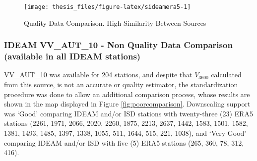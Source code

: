\documentclass[12pt,oneside]{reedthesis}
\begin{document}
\begin{figure}

{\centering \texttt{[image: thesis\_files/figure-latex/sideamera5-1]} 

}

\caption{Quality Data Comparison. High Similarity Between Sources}\label{fig:sideamera5}
\end{figure}
\hypertarget{ideam-vv_aut_10---non-quality-data-comparison-available-in-all-ideam-stations}{%
\subsubsection{IDEAM VV\_AUT\_10 - Non Quality Data Comparison (available in all IDEAM stations)}\label{ideam-vv_aut_10---non-quality-data-comparison-available-in-all-ideam-stations}}

VV\_AUT\_10 was available for 204 stations, and despite that \(V_{3600}\) calculated from this source, is not an accurate or quality estimator, the standardization procedure was done to allow an additional comparison process, whose results are shown in the map displayed in Figure \ref{fig:poorcomparison}. Downscaling support was `Good' comparing IDEAM and/or ISD stations with twenty-three (23) ERA5 stations (2261, 1971, 2066, 2020, 2260, 1875, 2213, 2637, 1442, 1583, 1501, 1582, 1381, 1493, 1485, 1397, 1338, 1055, 511, 1644, 515, 221, 1038), and `Very Good' comparing IDEAM and/or ISD with five (5) ERA5 stations (265, 360, 78, 312, 416).
\end{document}
